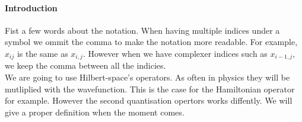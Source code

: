 \documentclass[../main.tex]{subfile}
\begin{document}
\paragraph{Introduction}


Fist a few words about the notation. When having multiple indices under a symbol we ommit the comma to make the notation more readable. 
For example, $x_{ij}$ is the same as $x_{i,j}$. However when we have complexer indices such as $x_{i-1, j}$, we keep the comma between all
the indicies.\\

We are going to use Hilbert-space's operators. As often in physics they will be mutliplied with the wavefunction. This is the case for the Hamiltonian 
operator for example. However the second quantisation opertors works diffently. We will give a proper definition when the moment comes.
\end{document}
